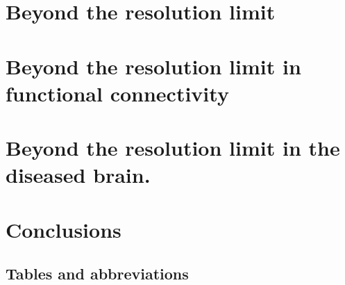 \chapter{Beyond the resolution limit}\label{chap:beyondresolutionlimit}


\chapter{Beyond the resolution limit in functional connectivity}\label{chap:beyondresolutionlimitfunctionalconnectivity}


\chapter{Beyond the resolution limit in the diseased brain.}


\chapter{Conclusions}\label{chap:conclusions}







\begin{appendices}
\chapter{Tables and abbreviations}


\end{appendices}

%
